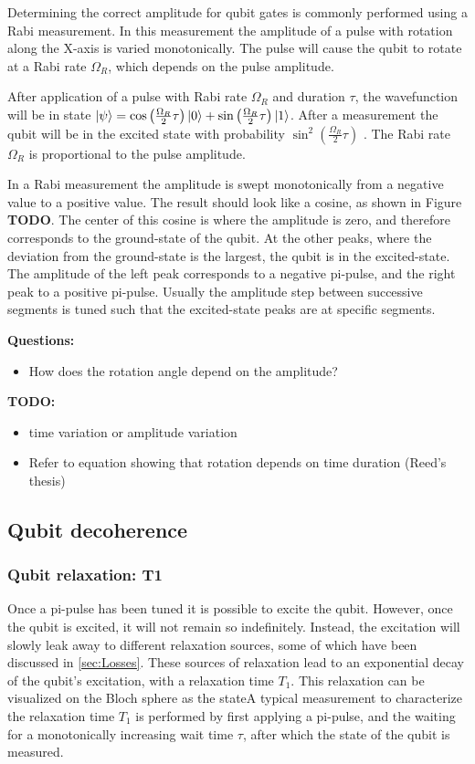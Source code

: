         Determining the correct amplitude for qubit gates is commonly performed using a Rabi measurement. In this measurement the amplitude of a pulse with rotation along the X-axis is varied monotonically. The pulse will cause the qubit to rotate at a Rabi rate $\Omega_R$, which depends on the pulse amplitude.

        After application of a pulse with Rabi rate $\Omega_R$ and duration $\tau$, the wavefunction will be in state $\ket{\psi} = \cos{\left( \frac{\Omega_R}{2} \tau \right) } \ket{0} + \sin{\left( \frac{\Omega_R}{2} \tau \right)} \ket{1}$. After a measurement the qubit will be in the excited state with probability $\sin^2{\left( \frac{\Omega_R}{2} \tau \right)}$ \cite{Reed}. The Rabi rate $\Omega_R$ is proportional to the pulse amplitude.

        In a Rabi measurement the amplitude is swept monotonically from a negative value to a positive value. The result should look like a cosine, as shown in Figure \textbf{TODO}. The center of this cosine is where the amplitude is zero, and therefore corresponds to the ground-state of the qubit. At the other peaks, where the deviation from the ground-state is the largest, the qubit is in the excited-state. The amplitude of the left peak corresponds to a negative pi-pulse, and the right peak to a positive pi-pulse. Usually the amplitude step between successive segments is tuned such that the excited-state peaks are at specific segments.

        \textbf{Questions:}
        \begin{itemize}
          \item How does the rotation angle depend on the amplitude?
        \end{itemize}
        \textbf{TODO:}
        \begin{itemize}
          \item time variation or amplitude variation
          \item Refer to equation showing that rotation depends on time duration (Reed's thesis)
        \end{itemize}

      \subsection{Qubit decoherence}

        \subsubsection{Qubit relaxation: T1}
          Once a pi-pulse has been tuned it is possible to excite the qubit. However, once the qubit is excited, it will not remain so indefinitely. Instead, the excitation will slowly leak away to different relaxation sources, some of which have been discussed in \ref{sec:Losses}. These sources of relaxation lead to an exponential decay of the qubit's excitation, with a relaxation time $T_1$. This relaxation can be visualized on the Bloch sphere as the stateA typical measurement to characterize the relaxation time $T_1$ is performed by first applying a pi-pulse, and the waiting for a monotonically increasing wait time $\tau$, after which the state of the qubit is measured.

